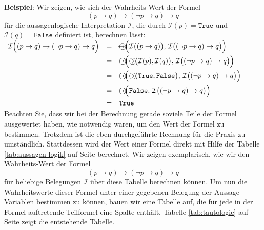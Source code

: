 \noindent
\textbf{Beispiel}: Wir zeigen, wie sich der Wahrheits-Wert der Formel
$$  (p \rightarrow q) \rightarrow (\neg p \rightarrow q) \rightarrow q $$
für die aussagenlogische Interpretation $\mathcal{I}$, die durch 
$\mathcal{I}(p) = \texttt{True}$ und $\mathcal{I}(q) = \texttt{False}$ definiert ist,
berechnen lässt: 
\\[0.2cm]
\hspace*{1.3cm}
$
  \begin{array}[b]{lcl}
   \mathcal{I}\Bigl( (p \rightarrow q) \rightarrow (\neg p \rightarrow q) \rightarrow q  \Bigr) 
   & = &  \circright\Bigl( \mathcal{I}\bigl( (p \rightarrow q) \bigr),\, \mathcal{I}\bigl((\neg p \rightarrow q) \rightarrow q\bigr) \Bigr) \\[0.2cm]
   & = & \circright\Bigl( \circright\bigl( \mathcal{I}(p), \mathcal{I}(q) \bigr),\, \mathcal{I}\bigl((\neg p \rightarrow q) \rightarrow q\bigr) \Bigr) \\[0.2cm]
   & = & \circright\Bigl( \circright\bigl( \texttt{True}, \texttt{False} \bigr),\, \mathcal{I}\bigl((\neg p \rightarrow q) \rightarrow q\bigr) \Bigr) \\[0.2cm]
   & = & \circright\Bigl( \texttt{False}, \, \mathcal{I}\bigl((\neg p \rightarrow q) \rightarrow q\bigr) \Bigr) \\[0.2cm]
   & = & \texttt{True} 
  \end{array}
$ \eox
\\[0.2cm]
Beachten Sie, dass wir bei der Berechnung gerade soviele Teile der Formel ausgewertet
haben, wie notwendig waren, um den Wert der Formel zu bestimmen.  Trotzdem ist die
eben durchgeführte Rechnung für die Praxis zu umständlich.  Stattdessen wird der Wert
einer Formel direkt mit Hilfe der Tabelle \ref{tab:aussagen-logik} auf Seite
\pageref{tab:aussagen-logik} berechnet.  Wir zeigen exemplarisch, wie wir den
Wahrheits-Wert der Formel
$$  (p \rightarrow q) \rightarrow (\neg p \rightarrow q) \rightarrow q $$
für beliebige Belegungen $\mathcal{I}$ über diese Tabelle berechnen können.
 Um nun die Wahrheitswerte 
dieser Formel unter einer gegebenen Belegung der Aussage-Variablen bestimmen zu können,
 bauen wir eine  Tabelle auf, die für jede in der Formel
auftretende Teilformel eine Spalte enthält.  Tabelle \ref{tab:tautologie} auf Seite
\pageref{tab:tautologie} zeigt die entstehende Tabelle.
